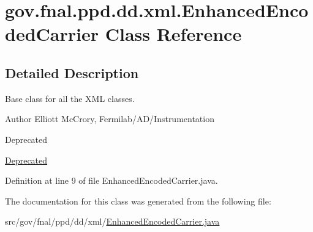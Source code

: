 \hypertarget{classgov_1_1fnal_1_1ppd_1_1dd_1_1xml_1_1EnhancedEncodedCarrier}{\section{gov.\-fnal.\-ppd.\-dd.\-xml.\-Enhanced\-Encoded\-Carrier Class Reference}
\label{classgov_1_1fnal_1_1ppd_1_1dd_1_1xml_1_1EnhancedEncodedCarrier}
}


\subsection{Detailed Description}
Base class for all the X\-M\-L classes.

\begin{DoxyAuthor}{Author}
Elliott Mc\-Crory, Fermilab/\-A\-D/\-Instrumentation 
\end{DoxyAuthor}
\begin{DoxyRefDesc}{Deprecated}
\item[\hyperlink{deprecated__deprecated000016}{Deprecated}]\end{DoxyRefDesc}


Definition at line 9 of file Enhanced\-Encoded\-Carrier.\-java.



The documentation for this class was generated from the following file\-:\begin{DoxyCompactItemize}
\item 
src/gov/fnal/ppd/dd/xml/\hyperlink{EnhancedEncodedCarrier_8java}{Enhanced\-Encoded\-Carrier.\-java}\end{DoxyCompactItemize}
